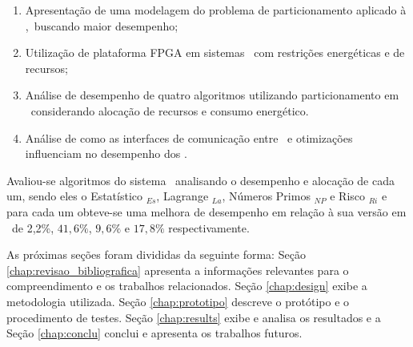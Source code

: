     \begin{enumerate}
        \item 
        
        Apresentação de uma modelagem do problema de particionamento aplicado à \wearables,\ buscando maior desempenho;
        
        \item 
        Utilização de plataforma FPGA em sistemas \wearables\ com restrições energéticas e de recursos;
        
        
        \item %
        Análise de desempenho de quatro algoritmos utilizando particionamento em \hardware\ considerando alocação de recursos e consumo energético.
        
        \item 
        Análise de como as interfaces de comunicação entre \hs\ e otimizações influenciam no desempenho dos \wearables.
        
    \end{enumerate}

    Avaliou-se algoritmos do sistema \wearable\ analisando o desempenho e alocação de cada um, sendo eles o Estatístico \Ss$_{Es}$, Lagrange \Ss$_{La}$, Números Primos \Ss$_{NP}$ e Risco \Ss$_{Ri}$ e para cada um obteve-se uma melhora de desempenho em relação à sua versão em \software\ de 2,2\%, $41,6\%$, $9,6\%$ e $17,8\%$ respectivamente.
    
    As próximas seções foram divididas da seguinte forma: 
    Seção \ref{chap:revisao_bibliografica} apresenta a informações relevantes para o compreendimento e os trabalhos relacionados. 
    Seção \ref{chap:design} exibe a metodologia utilizada.
    Seção \ref{chap:prototipo} descreve o protótipo e o procedimento de testes.
    Seção \ref{chap:results} exibe e analisa os resultados e a Seção \ref{chap:conclu} conclui e apresenta os trabalhos futuros.